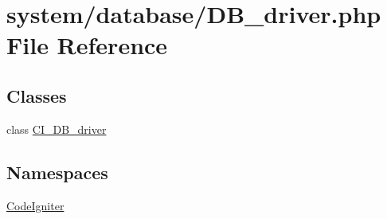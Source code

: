 \hypertarget{_d_b__driver_8php}{}\section{system/database/\+D\+B\+\_\+driver.php File Reference}
\label{_d_b__driver_8php}
\subsection*{Classes}
\begin{DoxyCompactItemize}
\item 
class \mbox{\hyperlink{class_c_i___d_b__driver}{C\+I\+\_\+\+D\+B\+\_\+driver}}
\end{DoxyCompactItemize}
\subsection*{Namespaces}
\begin{DoxyCompactItemize}
\item 
 \mbox{\hyperlink{namespace_code_igniter}{Code\+Igniter}}
\end{DoxyCompactItemize}
